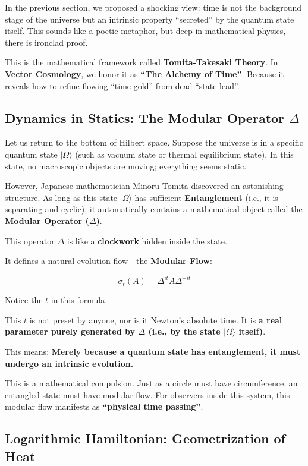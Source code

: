 \documentclass[11pt,a4paper,twoside]{book}
\begin{document}
In the previous section, we proposed a shocking view: time is not the background stage of the universe but an intrinsic property ``secreted'' by the quantum state itself. This sounds like a poetic metaphor, but deep in mathematical physics, there is ironclad proof.

This is the mathematical framework called \textbf{Tomita-Takesaki Theory}. In \textbf{Vector Cosmology}, we honor it as \textbf{``The Alchemy of Time''}. Because it reveals how to refine flowing ``time-gold'' from dead ``state-lead''.

\subsection{Dynamics in Statics: The Modular Operator $\Delta$}

Let us return to the bottom of Hilbert space. Suppose the universe is in a specific quantum state $|\Omega\rangle$ (such as vacuum state or thermal equilibrium state). In this state, no macroscopic objects are moving; everything seems static.

However, Japanese mathematician Minoru Tomita discovered an astonishing structure. As long as this state $|\Omega\rangle$ has sufficient \textbf{Entanglement} (i.e., it is separating and cyclic), it automatically contains a mathematical object called the \textbf{Modular Operator ($\Delta$)}.

This operator $\Delta$ is like a \textbf{clockwork} hidden inside the state.

It defines a natural evolution flow---the \textbf{Modular Flow}:

$$\sigma_t(A) = \Delta^{it} A \Delta^{-it}$$

Notice the $t$ in this formula.

This $t$ is not preset by anyone, nor is it Newton's absolute time. It is \textbf{a real parameter purely generated by $\Delta$ (i.e., by the state $|\Omega\rangle$ itself)}.

This means: \textbf{Merely because a quantum state has entanglement, it must undergo an intrinsic evolution.}

This is a mathematical compulsion. Just as a circle must have circumference, an entangled state must have modular flow. For observers inside this system, this modular flow manifests as \textbf{``physical time passing''}.

\subsection{Logarithmic Hamiltonian: Geometrization of Heat}
\end{document}
